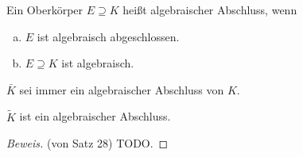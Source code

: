 \documentclass[a4paper]{report}
\begin{document}
\begin{defi}
  Ein Oberkörper $E \supseteq K$ heißt algebraischer Abschluss, wenn
  \begin{enumerate}[(a)]
    \item $E$ ist algebraisch abgeschlossen.
    \item $E \supseteq K$ ist algebraisch.
  \end{enumerate}
\end{defi}
\begin{bez*}
$\bar K$ sei immer ein algebraischer Abschluss von $K$.
\end{bez*}
\begin{bem*}[zu Satz 28]
$\tilde K$ ist ein algebraischer Abschluss.
\end{bem*}
\begin{proof}[Beweis](von Satz 28)
  TODO.
\end{proof}
\end{document}
